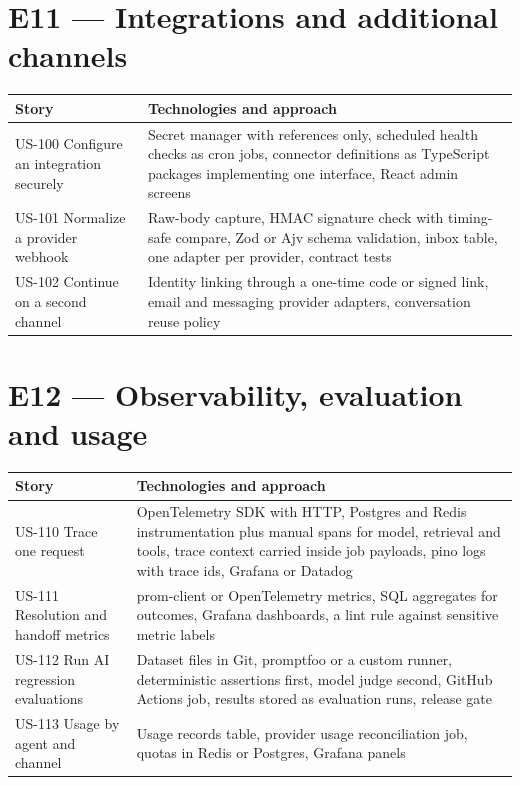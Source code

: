 \section{E11 --- Integrations and additional channels}

{\small
\begin{longtable}{@{}>{\raggedright\arraybackslash}p{}>{\raggedright\arraybackslash}p{}@{}}
\toprule
\textbf{Story} & \textbf{Technologies and approach} \\
\midrule
\endhead
\bottomrule
\endfoot
US-100 Configure an integration securely & Secret manager with references only, scheduled health checks as cron jobs, connector definitions as TypeScript packages implementing one interface, React admin screens \\
US-101 Normalize a provider webhook & Raw-body capture, HMAC signature check with timing-safe compare, Zod or Ajv schema validation, inbox table, one adapter per provider, contract tests \\
US-102 Continue on a second channel & Identity linking through a one-time code or signed link, email and messaging provider adapters, conversation reuse policy \\
\end{longtable}
}

\section{E12 --- Observability, evaluation and usage}

{\small
\begin{longtable}{@{}>{\raggedright\arraybackslash}p{}>{\raggedright\arraybackslash}p{}@{}}
\toprule
\textbf{Story} & \textbf{Technologies and approach} \\
\midrule
\endhead
\bottomrule
\endfoot
US-110 Trace one request & OpenTelemetry SDK with HTTP, Postgres and Redis instrumentation plus manual spans for model, retrieval and tools, trace context carried inside job payloads, pino logs with trace ids, Grafana or Datadog \\
US-111 Resolution and handoff metrics & prom-client or OpenTelemetry metrics, SQL aggregates for outcomes, Grafana dashboards, a lint rule against sensitive metric labels \\
US-112 Run AI regression evaluations & Dataset files in Git, promptfoo or a custom runner, deterministic assertions first, model judge second, GitHub Actions job, results stored as evaluation runs, release gate \\
US-113 Usage by agent and channel & Usage records table, provider usage reconciliation job, quotas in Redis or Postgres, Grafana panels \\
\end{longtable}
}

